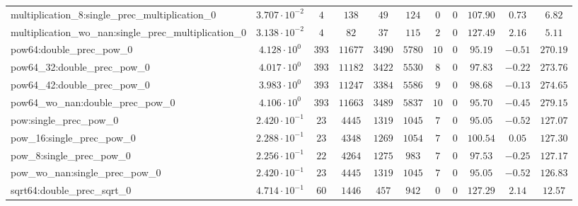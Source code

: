 \begin{tabular}{|l|c|c|c|c|c|c|c|c|c|c|}
multiplication\_8:single\_prec\_multiplication\_0         & $ 3.707 \cdot 10^{-2} $ & $ 4      $ & $ 138    $ & $ 49    $ & $ 124   $ & $ 0   $ & $ 0 $ & $ 107.90      $ & $ 0.73    $ & $ 6.82    $ \\
multiplication\_wo\_nan:single\_prec\_multiplication\_0   & $ 3.138 \cdot 10^{-2} $ & $ 4      $ & $ 82     $ & $ 37    $ & $ 115   $ & $ 2   $ & $ 0 $ & $ 127.49      $ & $ 2.16    $ & $ 5.11    $ \\
pow64:double\_prec\_pow\_0                                & $ 4.128 \cdot 10^{0}  $ & $ 393    $ & $ 11677  $ & $ 3490  $ & $ 5780  $ & $ 10  $ & $ 0 $ & $ 95.19       $ & $ -0.51   $ & $ 270.19  $ \\
pow64\_32:double\_prec\_pow\_0                            & $ 4.017 \cdot 10^{0}  $ & $ 393    $ & $ 11182  $ & $ 3422  $ & $ 5530  $ & $ 8   $ & $ 0 $ & $ 97.83       $ & $ -0.22   $ & $ 273.76  $ \\
pow64\_42:double\_prec\_pow\_0                            & $ 3.983 \cdot 10^{0}  $ & $ 393    $ & $ 11247  $ & $ 3384  $ & $ 5586  $ & $ 9   $ & $ 0 $ & $ 98.68       $ & $ -0.13   $ & $ 274.65  $ \\
pow64\_wo\_nan:double\_prec\_pow\_0                       & $ 4.106 \cdot 10^{0}  $ & $ 393    $ & $ 11663  $ & $ 3489  $ & $ 5837  $ & $ 10  $ & $ 0 $ & $ 95.70       $ & $ -0.45   $ & $ 279.15  $ \\
pow:single\_prec\_pow\_0                                  & $ 2.420 \cdot 10^{-1} $ & $ 23     $ & $ 4445   $ & $ 1319  $ & $ 1045  $ & $ 7   $ & $ 0 $ & $ 95.05       $ & $ -0.52   $ & $ 127.07  $ \\
pow\_16:single\_prec\_pow\_0                              & $ 2.288 \cdot 10^{-1} $ & $ 23     $ & $ 4348   $ & $ 1269  $ & $ 1054  $ & $ 7   $ & $ 0 $ & $ 100.54      $ & $ 0.05    $ & $ 127.30  $ \\
pow\_8:single\_prec\_pow\_0                               & $ 2.256 \cdot 10^{-1} $ & $ 22     $ & $ 4264   $ & $ 1275  $ & $ 983   $ & $ 7   $ & $ 0 $ & $ 97.53       $ & $ -0.25   $ & $ 127.17  $ \\
pow\_wo\_nan:single\_prec\_pow\_0                         & $ 2.420 \cdot 10^{-1} $ & $ 23     $ & $ 4445   $ & $ 1319  $ & $ 1045  $ & $ 7   $ & $ 0 $ & $ 95.05       $ & $ -0.52   $ & $ 126.83  $ \\
sqrt64:double\_prec\_sqrt\_0                              & $ 4.714 \cdot 10^{-1} $ & $ 60     $ & $ 1446   $ & $ 457   $ & $ 942   $ & $ 0   $ & $ 0 $ & $ 127.29      $ & $ 2.14    $ & $ 12.57   $ \\

\end{tabular}
